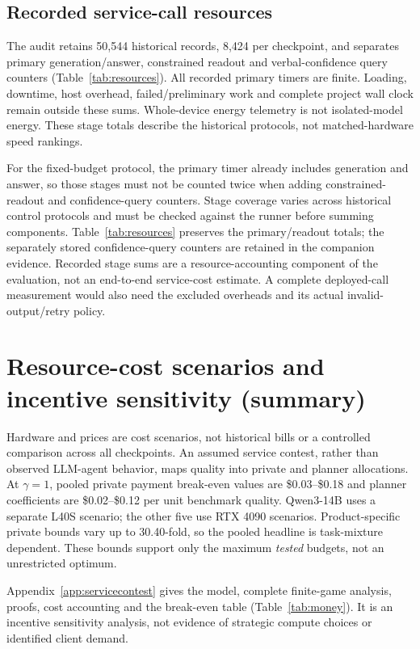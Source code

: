 \documentclass[sigconf,anonymous,nonacm]{acmart}
\begin{document}
\subsection{Recorded service-call resources}\label{sec:callresources}
The audit retains 50,544 historical records, 8,424 per checkpoint, and separates primary generation/answer, constrained readout and verbal-confidence query counters (Table~\ref{tab:resources}). All recorded primary timers are finite. Loading, downtime, host overhead, failed/preliminary work and complete project wall clock remain outside these sums. Whole-device energy telemetry is not isolated-model energy. These stage totals describe the historical protocols, not matched-hardware speed rankings.

For the fixed-budget protocol, the primary timer already includes generation and answer, so those stages must not be counted twice when adding constrained-readout and confidence-query counters. Stage coverage varies across historical control protocols and must be checked against the runner before summing components. Table~\ref{tab:resources} preserves the primary/readout totals; the separately stored confidence-query counters are retained in the companion evidence. Recorded stage sums are a resource-accounting component of the evaluation, not an end-to-end service-cost estimate. A complete deployed-call measurement would also need the excluded overheads and its actual invalid-output/retry policy.

\section{Resource-cost scenarios and incentive sensitivity (summary)}\label{sec:costsummary}
Hardware and prices are cost scenarios, not historical bills or a controlled comparison across all checkpoints. An assumed service contest, rather than observed LLM-agent behavior, maps quality into private and planner allocations. At $\gamma=1$, pooled private payment break-even values are \$0.03--\$0.18 and planner coefficients are \$0.02--\$0.12 per unit benchmark quality. Qwen3-14B uses a separate L40S scenario; the other five use RTX 4090 scenarios. Product-specific private bounds vary up to 30.40-fold, so the pooled headline is task-mixture dependent. These bounds support only the maximum \emph{tested} budgets, not an unrestricted optimum.

Appendix~\ref{app:servicecontest} gives the model, complete finite-game analysis, proofs, cost accounting and the break-even table (Table~\ref{tab:money}). It is an incentive sensitivity analysis, not evidence of strategic compute choices or identified client demand.
\end{document}
